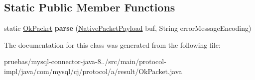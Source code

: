 \subsection*{Static Public Member Functions}
\begin{DoxyCompactItemize}
\item 
\mbox{\label{classcom_1_1mysql_1_1cj_1_1protocol_1_1a_1_1result_1_1_ok_packet_ae840f6c0902eb0a0b567500abf56e6e6}} 
static \mbox{\hyperlink{classcom_1_1mysql_1_1cj_1_1protocol_1_1a_1_1result_1_1_ok_packet}{Ok\+Packet}} {\bfseries parse} (\mbox{\hyperlink{classcom_1_1mysql_1_1cj_1_1protocol_1_1a_1_1_native_packet_payload}{Native\+Packet\+Payload}} buf, String error\+Message\+Encoding)
\end{DoxyCompactItemize}


The documentation for this class was generated from the following file\+:\begin{DoxyCompactItemize}
\item 
pruebas/mysql-\/connector-\/java-\/8../src/main/protocol-\/impl/java/com/mysql/cj/protocol/a/result/Ok\+Packet.\+java\end{DoxyCompactItemize}
